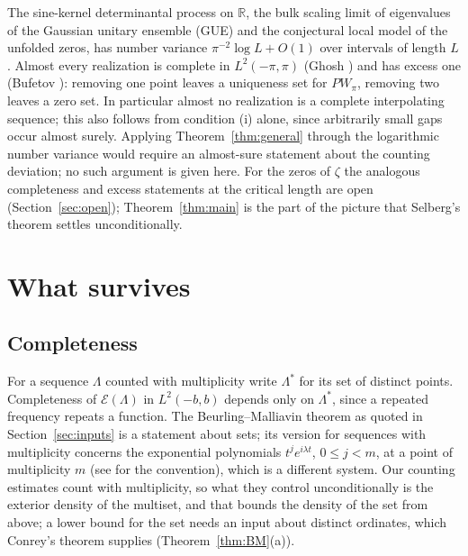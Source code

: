 \documentclass[11pt]{article}
\newcommand{\R}{\mathbb{R}}
\newcommand{\Lam}{\Lambda}
\newcommand{\E}{\mathcal{E}}
\begin{document}
\begin{remark}\label{rem:sine}
The sine-kernel determinantal process on $\R$, the bulk scaling limit of eigenvalues of the Gaussian unitary ensemble (GUE) and the conjectural local model of the unfolded zeros, has number variance $\pi^{-2}\log L+O(1)$ over intervals of length $L$ \cite{Dyson}. Almost every realization is complete in $L^2(-\pi,\pi)$ (Ghosh \cite{Ghosh}) and has excess one (Bufetov \cite{Bufetov}): removing one point leaves a uniqueness set for $PW_\pi$, removing two leaves a zero set. In particular almost no realization is a complete interpolating sequence; this also follows from condition (i) alone, since arbitrarily small gaps occur almost surely. Applying Theorem~\ref{thm:general} through the logarithmic number variance would require an almost-sure statement about the counting deviation; no such argument is given here. For the zeros of $\zeta$ the analogous completeness and excess statements at the critical length are open (Section~\ref{sec:open}); Theorem~\ref{thm:main} is the part of the picture that Selberg's theorem settles unconditionally.
\end{remark}

\section{What survives}\label{sec:survives}

\subsection{Completeness}
For a sequence $\Lam$ counted with multiplicity write $\Lam^\ast$ for its set of distinct points. Completeness of $\E(\Lam)$ in $L^2(-b,b)$ depends only on $\Lam^\ast$, since a repeated frequency repeats a function. The Beurling--Malliavin theorem as quoted in Section~\ref{sec:inputs} is a statement about sets; its version for sequences with multiplicity concerns the exponential polynomials $t^je^{i\lambda t}$, $0\le j<m$, at a point of multiplicity $m$ (see \cite[p.~1745]{SeipUlanovskii} for the convention), which is a different system. Our counting estimates count with multiplicity, so what they control unconditionally is the exterior density of the multiset, and that bounds the density of the set from above; a lower bound for the set needs an input about distinct ordinates, which Conrey's theorem supplies (Theorem~\ref{thm:BM}(a)).
\end{document}
